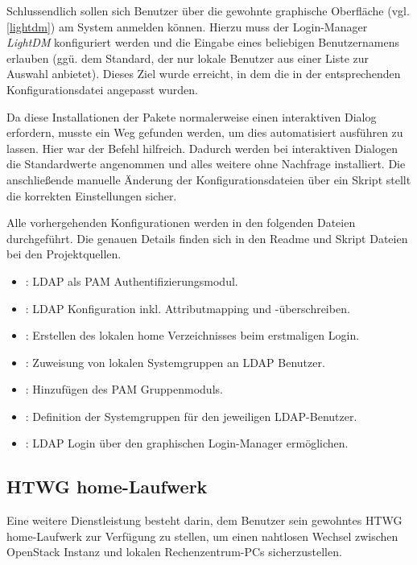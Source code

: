 Schlussendlich sollen sich Benutzer über die gewohnte graphische Oberfläche (vgl. \autoref{lightdm}) am System anmelden können.
Hierzu muss der Login-Manager \emph{LightDM} konfiguriert werden und die Eingabe eines beliebigen Benutzernamens erlauben (ggü. dem Standard, der nur lokale Benutzer aus einer Liste zur Auswahl anbietet).
Dieses Ziel wurde erreicht, in dem die  in der entsprechenden Konfigurationsdatei angepasst wurden.

Da diese Installationen der Pakete normalerweise einen interaktiven Dialog erfordern, musste ein Weg gefunden werden, um dies automatisiert ausführen zu lassen.
Hier war der Befehl  hilfreich. 
Dadurch werden bei interaktiven Dialogen die Standardwerte angenommen und alles weitere ohne Nachfrage installiert. 
Die anschließende manuelle Änderung der Konfigurationsdateien über ein Skript stellt die korrekten Einstellungen sicher.

Alle vorhergehenden Konfigurationen werden in den folgenden Dateien durchgeführt. 
Die genauen Details finden sich in den Readme und Skript Dateien bei den Projektquellen.

\begin{itemize}
\item {}: LDAP als PAM Authentifizierungsmodul.
\item {}: LDAP Konfiguration inkl. Attributmapping und -überschreiben.
\item {}: Erstellen des lokalen home Verzeichnisses beim erstmaligen Login.
\item {}: Zuweisung von lokalen Systemgruppen an LDAP Benutzer.
\item {}: Hinzufügen des PAM Gruppenmoduls.
\item {}: Definition der Systemgruppen für den jeweiligen LDAP-Benutzer.
\item {}: LDAP Login über den graphischen Login-Manager ermöglichen.
\end{itemize}

\subsection{HTWG home-Laufwerk}

Eine weitere Dienstleistung besteht darin, dem Benutzer sein gewohntes HTWG home-Laufwerk zur Verfügung zu stellen, um einen nahtlosen Wechsel zwischen OpenStack Instanz und lokalen Rechenzentrum-PCs sicherzustellen.

